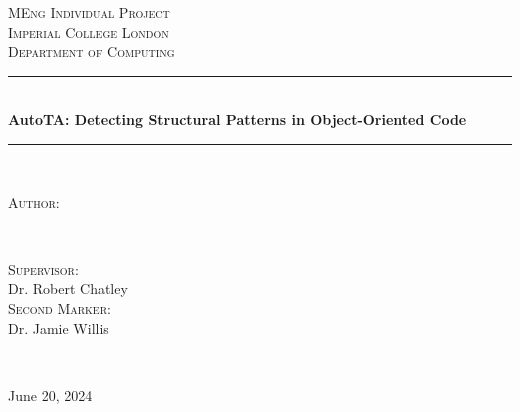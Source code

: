 \begin{titlepage}

\newcommand{\HRule}{\rule{\linewidth}{0.5mm}}

\begin{center}
    
\end{center}
\vspace*{\fill}

\center
\textsc{\LARGE MEng Individual Project}\\[1.5cm]
\textsc{\Large Imperial College London}\\[0.3cm]
\textsc{\large Department of Computing}\\[0.5cm]

\makeatletter
\HRule \\[0.7cm]
{\Huge{\textbf{AutoTA: Detecting Structural Patterns in Object-Oriented Code}}}\\[0.35cm]
\HRule \\[1.5cm]

\begin{minipage}{0.4\textwidth}
\begin{flushleft} \large
\textsc{Author:}\\
\@author
\end{flushleft}
\end{minipage}
~
\begin{minipage}{0.4\textwidth}
\begin{flushright} \large
\textsc{Supervisor:} \\
Dr. Robert Chatley \\[1.2em]
\textsc{Second Marker:} \\
Dr. Jamie Willis
\end{flushright}
\end{minipage}\\[2cm]
\makeatother

\vfill

{\Large June 20, 2024}\\[2cm]

\end{titlepage}
